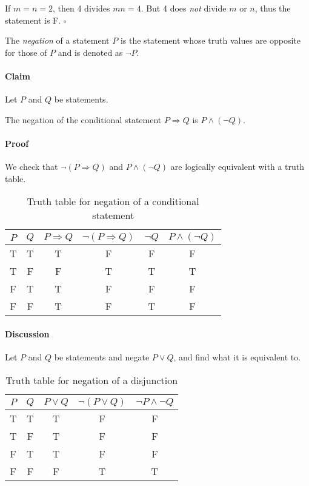 \documentclass[../main.tex]{subfiles}
\begin{document}
If $m = n = 2$, then 4 divides $mn = 4$. But 4 does \emph{not} divide $m$ or $n$, thus the 
statement is F. $\square$

The \emph{negation} of a statement $P$ is the statement whose truth values are opposite for those of
$P$ and is denoted as $\neg P$.

\paragraph{Claim} Let $P$ and $Q$ be statements.

The negation of the conditional statement $P \Rightarrow Q$ is $P \land (\neg Q)$.

\paragraph{Proof}
    We check that $\neg(P \Rightarrow Q)$ and $P \land (\neg Q)$ are logically equivalent with a
    truth table.

\begin{table}[ht]
    \centering
    \begin{tabular}{c|c|c|c|c|c}
        $P$ & $Q$ & $P \Rightarrow Q$ & $\neg(P \Rightarrow Q)$ & $\neg Q$ & $P \land (\neg Q)$ \\
        \hline
        T & T & T & F & F & F \\
        T & F & F & T & T & T \\
        F & T & T & F & F & F \\
        F & F & T & F & T & F
    \end{tabular}
    \caption{Truth table for negation of a conditional statement}
\end{table}

\paragraph{Discussion}

Let $P$ and $Q$ be statements and negate $P \lor Q$, and find what it is equivalent to.

\begin{table}[ht]
    \centering
    \begin{tabular}{c|c|c|c|c}
        $P$ & $Q$ & $P \lor Q$ & $\neg(P \lor Q)$ & $\neg P \land \neg Q$ \\
        \hline
        T & T & T & F & F \\
        T & F & T & F & F \\
        F & T & T & F & F \\
        F & F & F & T & T
    \end{tabular}
    \caption{Truth table for negation of a disjunction}
\end{table}
\end{document}
